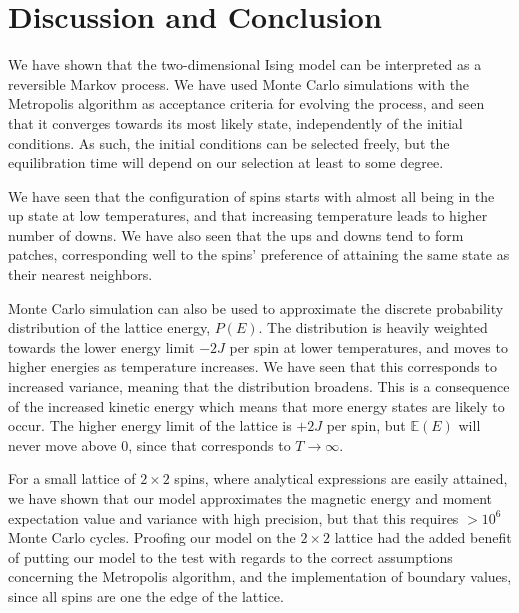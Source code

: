 \documentclass[]{article}
\begin{document}
\clearpage
\section{Discussion and Conclusion} \label{sec:conclusion}

We have shown that the two-dimensional Ising model can be interpreted as a reversible Markov process. We have used Monte Carlo simulations with the Metropolis algorithm as acceptance criteria for evolving the process, and seen that it converges towards its most likely state, independently of the initial conditions. As such, the initial conditions can be selected freely, but the equilibration time will depend on our selection at least to some degree.

We have seen that the configuration of spins starts with almost all being in the up state at low temperatures, and that increasing temperature leads to higher number of downs. We have also seen that the ups and downs tend to form patches, corresponding well to the spins' preference of attaining the same state as their nearest neighbors.

Monte Carlo simulation can also be used to approximate the discrete probability distribution of the lattice energy, $P(E)$. The distribution is heavily weighted towards the lower energy limit $-2J$ per spin at lower temperatures, and moves to higher energies as temperature increases. We have seen that this corresponds to increased variance, meaning that the distribution broadens. This is a consequence of the increased kinetic energy which means that more energy states are likely to occur. The higher energy limit of the lattice is $+2J$ per spin, but $\mathbb{E}(E)$ will never move above 0, since that corresponds to $T \rightarrow \infty$.

For a small lattice of $2 \times 2$ spins, where analytical expressions are easily attained, we have shown that our model approximates the magnetic energy and moment expectation value and variance with high precision, but that this requires $> 10^6$ Monte Carlo cycles. Proofing our model on the $2 \times 2$ lattice had the added benefit of putting our model to the test with regards to the correct assumptions concerning the Metropolis algorithm, and the implementation of boundary values, since all spins are one the edge of the lattice.
\end{document}
